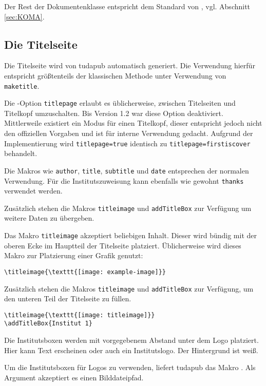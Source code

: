 \documentclass[
	ngerman,
	accentcolor=9c,%
	]{tudapub}
\let\code\texttt
\let\cls\textsf
\begin{document}
\noindent Der Rest der Dokumentenklasse entspricht dem Standard von \KOMAScript, vgl. Abschnitt \ref{sec:KOMA}.

\subsection{Die Titelseite}
\label{sec:title}

Die Titelseite wird von tudapub automatisch generiert. Die Verwendung hierfür entspricht größtenteils der klassischen Methode unter Verwendung von \code{maketitle}.

Die \KOMAScript-Option \code{titlepage} erlaubt es üblicherweise, zwischen Titelseiten und Titelkopf umzuschalten. Bis Version 1.2 war diese Option deaktiviert. Mittlerweile existiert ein Modus für einen Titelkopf, dieser entspricht jedoch nicht den offiziellen Vorgaben und ist für interne Verwendung gedacht. Aufgrund der Implementierung wird \code{titlepage=true} identisch zu \code{titlepage=firstiscover} behandelt.

Die Makros wie \code{author}, \code{title}, \code{subtitle} und \code{date} entsprechen der normalen Verwendung. Für die Institutszuweisung kann ebenfalls wie gewohnt \code{thanks} verwendet werden.

Zusätzlich stehen die Makros \code{titleimage} und \code{addTitleBox} zur Verfügung um weitere Daten zu übergeben.

Das Makro \code{titleimage} akzeptiert beliebigen Inhalt. Dieser wird bündig mit der oberen Ecke im Hauptteil der Titelseite platziert.
Üblicherweise wird dieses Makro zur Platzierung einer Grafik genutzt:

\begin{verbatim}
\titleimage{\texttt{[image: example-image]}}
\end{verbatim}

Zusätzlich stehen die Makros \code{titleimage} und \code{addTitleBox} zur Verfügung, um den unteren Teil der Titelseite zu füllen.

\begin{verbatim}
\titleimage{\texttt{[image: titleimage]}}
\addTitleBox{Institut 1}
\end{verbatim}
Die Institutsboxen werden mit vorgegebenem Abstand unter dem Logo platziert. Hier kann Text erscheinen oder auch ein Institutslogo. Der Hintergrund ist weiß.

Um die Institutsboxen für Logos zu verwenden, liefert \cls{tudapub} das Makro \code{\addTitleBoxLogo}. Als Argument akzeptiert es einen Bilddateipfad.
\end{document}
